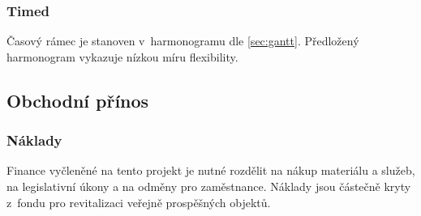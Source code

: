 \documentclass[a4paper, twoside, 11pt]{article}
\begin{document}
		\subsubsection{Timed}
			Časový rámec je stanoven v~harmonogramu dle \ref{sec:gantt}. Předložený harmonogram vykazuje nízkou míru flexibility.
	\subsection{Obchodní přínos}
		\subsubsection{Náklady}
			Finance vyčleněné na tento projekt je nutné rozdělit na nákup materiálu a služeb, na legislativní úkony a na odměny pro zaměstnance. Náklady jsou částečně kryty z~fondu pro revitalizaci veřejně prospěšných objektů.
			
\end{document}

